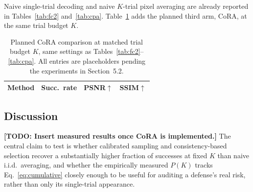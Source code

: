 \documentclass{article}
\newcommand{\todo}[1]{\textbf{[TODO: #1]}}
\begin{document}
Naive single-trial decoding and naive $K$-trial pixel averaging are already
reported in Tables~\ref{tab:fc2} and~\ref{tab:cpa}. Table~\ref{tab:planned}
adds the planned third arm, CoRA, at the same trial budget $K$.

\begin{table}[t]
\caption{Planned CoRA comparison at matched trial budget $K$, same settings
as Tables~\ref{tab:fc2}--\ref{tab:cpa}. All entries are placeholders pending
the experiments in Section~5.2.}
\label{tab:planned}
\centering
\small
\begin{tabular}{lccc}
\toprule
Method & Succ.\ rate & PSNR$\uparrow$ & SSIM$\uparrow$\\
\bottomrule
\end{tabular}
\end{table}

\subsection{Discussion}
\todo{Insert measured results once CoRA is implemented.} The central claim
to test is whether calibrated sampling and consistency-based selection
recover a substantially higher fraction of successes at fixed $K$ than naive
i.i.d.\ averaging, and whether the empirically measured $P(K)$ tracks
Eq.~\eqref{eq:cumulative} closely enough to be useful for auditing a
defense's real risk, rather than only its single-trial appearance.
\end{document}
